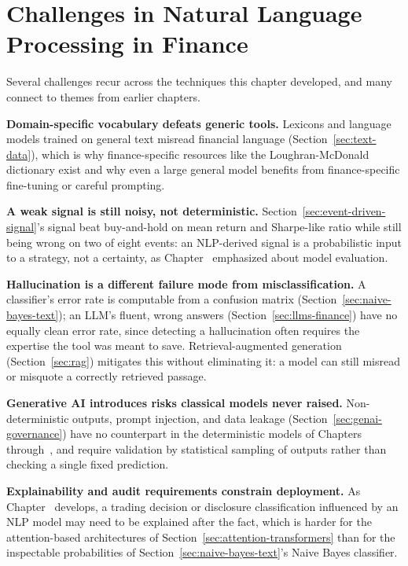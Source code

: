 \documentclass[../ai_in_finance]{subfiles}
\begin{document}
\section{Challenges in Natural Language Processing in Finance}

Several challenges recur across the techniques this chapter developed, and many connect to themes from earlier chapters.

\textbf{Domain-specific vocabulary defeats generic tools.} Lexicons and language models trained on general text misread financial language (Section~\ref{sec:text-data}), which is why finance-specific resources like the Loughran-McDonald dictionary exist and why even a large general model benefits from finance-specific fine-tuning or careful prompting.

\textbf{A weak signal is still noisy, not deterministic.} Section~\ref{sec:event-driven-signal}'s signal beat buy-and-hold on mean return and Sharpe-like ratio while still being wrong on two of eight events: an NLP-derived signal is a probabilistic input to a strategy, not a certainty, as Chapter~ emphasized about model evaluation.

\textbf{Hallucination is a different failure mode from misclassification.} A classifier's error rate is computable from a confusion matrix (Section~\ref{sec:naive-bayes-text}); an LLM's fluent, wrong answers (Section~\ref{sec:llms-finance}) have no equally clean error rate, since detecting a hallucination often requires the expertise the tool was meant to save. Retrieval-augmented generation (Section~\ref{sec:rag}) mitigates this without eliminating it: a model can still misread or misquote a correctly retrieved passage.

\textbf{Generative AI introduces risks classical models never raised.} Non-deterministic outputs, prompt injection, and data leakage (Section~\ref{sec:genai-governance}) have no counterpart in the deterministic models of Chapters~ through~, and require validation by statistical sampling of outputs rather than checking a single fixed prediction.

\textbf{Explainability and audit requirements constrain deployment.} As Chapter~ develops, a trading decision or disclosure classification influenced by an NLP model may need to be explained after the fact, which is harder for the attention-based architectures of Section~\ref{sec:attention-transformers} than for the inspectable probabilities of Section~\ref{sec:naive-bayes-text}'s Naive Bayes classifier.
\end{document}
